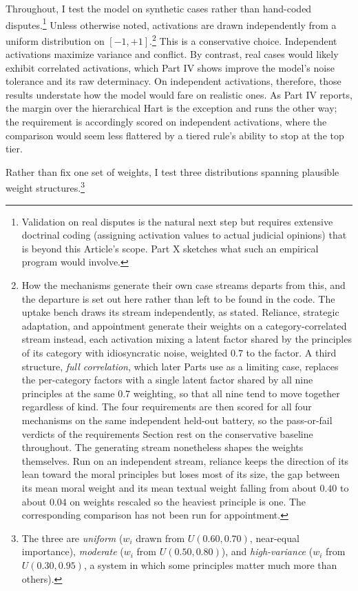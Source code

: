 Throughout, I test the model on synthetic cases rather than hand-coded
disputes.\footnote{Validation on real disputes is the natural next step but
requires extensive doctrinal coding (assigning activation values to actual
judicial opinions) that is beyond this Article's scope. Part X sketches what
such an empirical program would involve.} Unless otherwise noted, activations are drawn independently from a uniform
distribution on $[-1,+1]$.\footnote{How the mechanisms generate their own case streams departs from this, and the
departure is set out here rather than left to be found in the code. The uptake
bench draws its stream independently, as stated. Reliance, strategic
adaptation, and appointment generate their weights on a category-correlated
stream instead, each activation mixing a latent factor shared by the
principles of its category with idiosyncratic noise, weighted $0.7$ to the
factor. A third structure, \textit{full correlation}, which later Parts use as
a limiting case, replaces the per-category factors with a single latent factor
shared by all nine principles at the same $0.7$ weighting, so that all nine
tend to move together regardless of kind. The four requirements are then scored for all four mechanisms on the
same independent held-out battery, so the pass-or-fail verdicts of the
requirements Section rest on the conservative baseline throughout. The
generating stream nonetheless shapes the weights themselves. Run on an
independent stream, reliance keeps the direction of its lean toward the moral
principles but loses most of its size, the gap between its mean moral weight
and its mean textual weight falling from about $0.40$ to about $0.04$ on
weights rescaled so the heaviest principle is one. The corresponding
comparison has not been run for appointment.} This is a conservative choice. Independent
activations maximize variance and conflict. By contrast, real cases would likely exhibit correlated activations, which
Part IV shows improve the model's noise tolerance and its raw determinacy.
On independent activations, therefore, those results understate how the
model would fare on realistic ones. As Part IV reports, the margin over the hierarchical Hart is the exception
and runs the other way; the requirement is accordingly scored on independent activations, where the
comparison would seem less flattered by a tiered rule's ability to stop at
the top tier.

Rather than fix one set of weights, I test three distributions spanning
plausible weight structures.\footnote{The three are \textit{uniform} ($w_i$
drawn from $U(0.60, 0.70)$, near-equal importance), \textit{moderate} ($w_i$
from $U(0.50, 0.80)$), and \textit{high-variance} ($w_i$ from $U(0.30,
0.95)$, a system in which some principles matter much more than others).}

